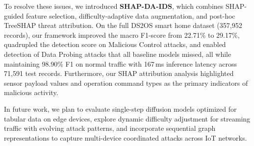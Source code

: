 To resolve these issues, we introduced \textbf{SHAP-DA-IDS}, which combines SHAP-guided feature selection, difficulty-adaptive data augmentation, and post-hoc TreeSHAP threat attribution. On the full DS2OS smart home dataset (357,952 records), our framework improved the macro F1-score from 22.71\% to 29.17\%, quadrupled the detection score on Malicious Control attacks, and enabled detection of Data Probing attacks that all baseline models missed, all while maintaining 98.90\% F1 on normal traffic with 167\,ms inference latency across 71,591 test records. Furthermore, our SHAP attribution analysis highlighted sensor payload values and operation command types as the primary indicators of malicious activity.

In future work, we plan to evaluate single-step diffusion models optimized for tabular data on edge devices, explore dynamic difficulty adjustment for streaming traffic with evolving attack patterns, and incorporate sequential graph representations to capture multi-device coordinated attacks across IoT networks.
